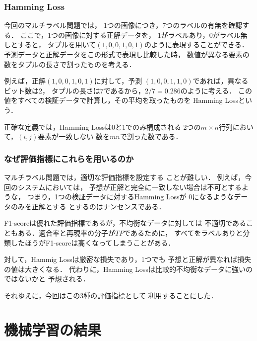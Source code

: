 \subsubsection{Hamming Loss}
今回のマルチラベル問題では，
1つの画像につき，7つのラベルの有無を確認する．
ここで，1つの画像に対する正解データを，
1がラベルあり，0がラベル無しとすると，
タプルを用いて$(1,0,0,1,0,1)$のように表現することができる．
予測データと正解データをこの形式で表現し比較した時，
数値が異なる要素の数をタプルの長さで割ったものを考える．

例えば，正解$(1,0,0,1,0,1)$に対して，予測
$(1,0,0,1,1,0)$であれば，異なるビット数は2，
タプルの長さは7であるから，$2/7 = 0.286$のように考える．
この値をすべての検証データで計算し，その平均を取ったものを
Hamming Lossという．

正確な定義では，Hamming Lossは0と1でのみ構成される
2つの$m \times n$行列において，$(i,j)$要素が一致しない
数を$mn$で割った数である．
\subsubsection{なぜ評価指標にこれらを用いるのか}
マルチラベル問題では，適切な評価指標を設定する
ことが難しい．
例えば，今回のシステムにおいては，
予想が正解と完全に一致しない場合は不可とするような，
つまり，1つの検証データに対するHamming Lossが
0になるようなデータのみを正解とする
とするのはナンセンスである．

F1-scoreは優れた評価指標であるが，不均衡なデータに対しては
不適切であることもある．適合率と再現率の分子が$TP$であるために，
すべてをラベルありと分類したほうがF1-scoreは高くなってしまうことがある．

対して，Hammig Lossは厳密な損失であり，1つでも
予想と正解が異なれば損失の値は大きくなる．
代わりに，Hamming Lossは比較的不均衡なデータに強いのではないかと
予想される．

それゆえに，今回はこの3種の評価指標として
利用することにした．
\section{機械学習の結果}